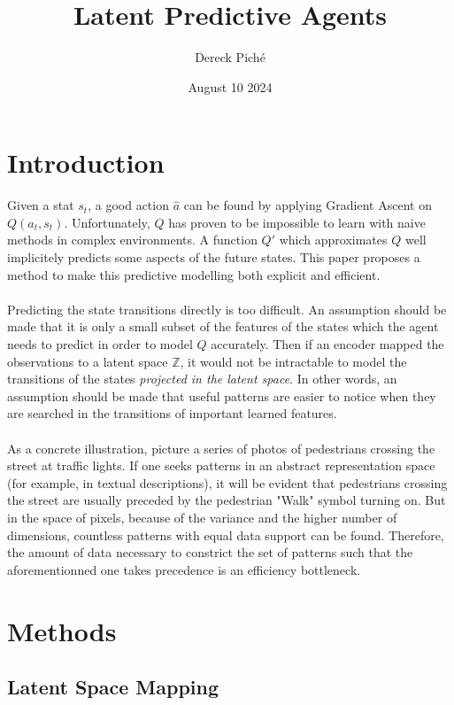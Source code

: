 \documentclass[]{article}
\title{Latent Predictive Agents}
\author{Dereck Piché}
\date{August 10 2024}
\begin{document}
\maketitle



\section{Introduction}

Given a stat $s_t$, a good action $\hat{a}$ can be found by applying Gradient Ascent on $Q(a_t, s_t)$. 
Unfortunately, $Q$ has proven to be impossible to learn with naive methods in complex environments.
A function $Q'$ which approximates $Q$ well implicitely predicts some aspects of the future states.
This paper proposes a method to make this predictive modelling both explicit and efficient.
\\ \\
Predicting the state transitions directly is too difficult. 
An assumption should be made that it is only a small subset of the features of the states which the agent needs to predict in order to model $Q$ accurately. 
Then if an encoder mapped the observations to a latent space $\mathbb{Z}$, it would not be intractable to model the transitions of the states \textit{projected in the latent space}. 
In other words, an assumption should be made that useful patterns are easier to notice when they are searched in the transitions of important learned features.
\\  \\
As a concrete illustration, picture a series of photos of pedestrians crossing the street at traffic lights. If one seeks patterns in an abstract representation space (for example, in textual descriptions), it will be evident that pedestrians crossing the street are usually preceded by the pedestrian "Walk" symbol turning on. But in the space of pixels, because of the variance and the higher number of dimensions, countless patterns with equal data support can be found. Therefore, the amount of data necessary to constrict the set of patterns such that the aforementionned one takes precedence is an efficiency bottleneck.

\newpage
\section{Methods}

\subsection{Latent Space Mapping}
\end{document}
